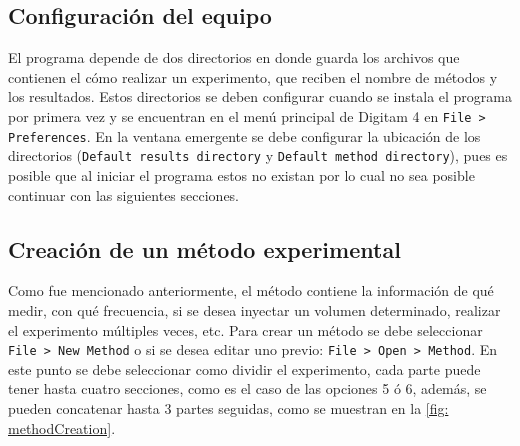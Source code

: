 	\subsection{Configuración del equipo}
	El programa depende de dos directorios en donde guarda los archivos que contienen el c\'omo realizar un experimento, que reciben el nombre de m\'etodos y los resultados. Estos directorios se deben configurar cuando se instala el programa por primera vez y se encuentran en el men\'u principal de Digitam 4 en \texttt{File > Preferences}. En la ventana emergente se debe configurar la ubicaci\'on de los directorios (\texttt{Default results directory} y \texttt{Default method directory}), pues es posible que al iniciar el programa estos no existan por lo cual no sea posible continuar con las siguientes secciones.
	
	\subsection{Creación de un método experimental}
	Como fue mencionado anteriormente, el m\'etodo contiene la informaci\'on de qu\'e medir, con qu\'e frecuencia, si se desea inyectar un volumen determinado, realizar el experimento m\'ultiples veces, etc. Para crear un m\'etodo se debe seleccionar \texttt{File > New Method} o si se desea editar uno previo: \texttt{File > Open > Method}. En este punto se debe seleccionar como dividir el experimento, cada parte puede tener hasta cuatro secciones, como es el caso de las opciones 5 \'o 6, adem\'as, se pueden concatenar hasta 3 partes seguidas, como se muestran en la \autoref{fig: methodCreation}.
	
